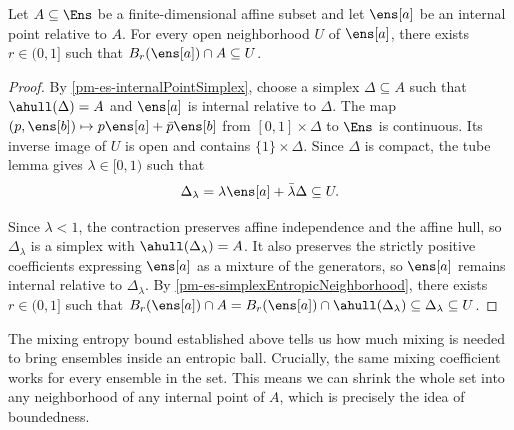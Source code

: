 \begin{mathSection}
\begin{prop}\label{pm-es-finiteDimensionalEntropicNeighborhood}
	Let $A \subseteq \Ens$ be a finite-dimensional affine subset and let $\ens[a]$ be an internal point relative to $A$. For every open neighborhood $U$ of $\ens[a]$, there exists $r \in (0,1]$ such that $B_r(\ens[a]) \cap A \subseteq U$.
\end{prop}

\begin{proof}
	By \ref{pm-es-internalPointSimplex}, choose a simplex $\Delta \subseteq A$ such that $\ahull(\Delta)=A$ and $\ens[a]$ is internal relative to $\Delta$. The map $(p,\ens[b]) \mapsto p\ens[a]+\bar{p}\ens[b]$ from $[0,1]\times\Delta$ to $\Ens$ is continuous. Its inverse image of $U$ is open and contains $\{1\}\times\Delta$. Since $\Delta$ is compact, the tube lemma gives $\lambda \in [0,1)$ such that
	\begin{equation}
		\Delta_\lambda = \lambda\ens[a]+\bar{\lambda}\Delta \subseteq U.
	\end{equation}
	
	Since $\lambda<1$, the contraction preserves affine independence and the affine hull, so $\Delta_\lambda$ is a simplex with $\ahull(\Delta_\lambda)=A$. It also preserves the strictly positive coefficients expressing $\ens[a]$ as a mixture of the generators, so $\ens[a]$ remains internal relative to $\Delta_\lambda$. By \ref{pm-es-simplexEntropicNeighborhood}, there exists $r \in (0,1]$ such that $B_r(\ens[a])\cap A = B_r(\ens[a])\cap\ahull(\Delta_\lambda) \subseteq \Delta_\lambda \subseteq U$.
\end{proof}
\end{mathSection}

The mixing entropy bound established above tells us how much mixing is needed to bring ensembles inside an entropic ball. Crucially, the same mixing coefficient works for every ensemble in the set. This means we can shrink the whole set into any neighborhood of any internal point of $A$, which is precisely the idea of boundedness.

